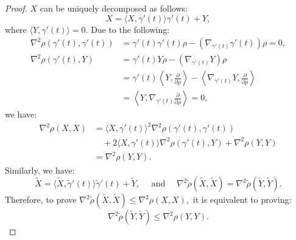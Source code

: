 \documentclass{ctexart}
\begin{document}
\begin{proof}[Proof]
  $X$ can be uniquely decomposed as follows:
  $$
  X = \langle X, \gamma'(t)\rangle {\gamma}'(t) + Y,
  $$
  where $\langle Y, \gamma'(t)\rangle = 0$. Due to the following:
  $$
  \begin{aligned}
  \nabla^2 \rho(\gamma'(t), \gamma'(t)) &= \gamma'(t) \gamma'(t) \rho - \left(\nabla_{\gamma'(t)} \gamma'(t)\right) \rho = 0, \\
  \nabla^2 \rho(\gamma'(t), Y) &= \gamma'(t) Y \rho - \left(\nabla_{\gamma'(t)} Y\right) \rho \\
  &= \gamma'(t) \left\langle Y, \frac{\partial}{\partial \rho}\right\rangle - \left\langle\nabla_{\gamma'(t)} Y, \frac{\partial}{\partial \rho}\right\rangle \\
  &= \left\langle Y, \nabla_{\gamma'(t)} \frac{\partial}{\partial \rho}\right\rangle = 0,
  \end{aligned}
  $$
  we have:
  $$
  \begin{aligned}
  \nabla^2 \rho(X, X) 
  &= \langle X, \gamma'(t)\rangle^2 \nabla^2 \rho(\gamma'(t), \gamma'(t)) \\
  &\quad + 2\langle X, \gamma'(t)\rangle \nabla^2 \rho(\gamma'(t), Y) + \nabla^2 \rho(Y, Y)  \\
  &= \nabla^2 \rho(Y, Y).
  \end{aligned}
  $$
  Similarly, we have:
  $$
  \tilde{X} = \langle\tilde{X}, \widetilde{\gamma}'(t)\rangle \widetilde{\gamma}'(t) + \widetilde{Y}, \quad \text{ and }\quad
  \nabla^2 \widetilde{\rho}(\tilde{X}, \widetilde{X}) = \nabla^2 \widetilde{\rho}(\tilde{Y}, \widetilde{Y}).
  $$
  Therefore, to prove $\nabla^2 \widetilde{\rho}(\tilde{X}, \widetilde{X}) \leq \nabla^2 \rho(X, X),$ it is equivalent to proving:
  $$
  \nabla^2 \widetilde{\rho}(\tilde{Y}, \tilde{Y}) \leq \nabla^2 \rho(Y, Y).
  $$


\end{proof}
\end{document}

